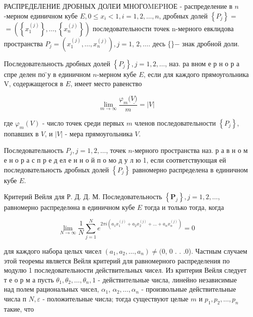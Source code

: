 \documentclass[10pt]{article}
\begin{document}
РАСПРЕДЕЛЕНИЕ ДРОБНЫХ ДОЛЕИ МНОГОMEPHОЕ - распределение в $n$-мерном единичном кубе $E, 0 \leqslant x_{i}<1, i=1,2, \ldots, n$, дробных долей $\left\{P_{j}\right\}=$ $=\left(\left\{x_{1}^{(j)}\right\}, \ldots,\left\{x_{n}^{(j)}\right\}\right)$ последовательности точек n-мерного евклидова пространства $P_{j}=\left(x_{1}^{(j)}, \ldots, x_{n}^{(j)}\right), j=1$, $2, \ldots$. десь \{\}$-$ знак дробной доли.



Последовательность дробных долей $\left\{P_{j}\right\}, j=1,2, \ldots$, наз. ра вном е р н о р а спре делен по ̈у в единичном $n$-мерном кубе $E$, если для каждого прямоугольника $\mathrm{V}$, содержащегося в $E$, имеет место равенство



\[

\lim _{m \rightarrow \infty} \frac{\varphi_{m}(\underline{V)}}{m}=|V|

\]



где $\varphi_{m}(V)$ - число точек среди первых $m$ членов последовательности $\left\{P_{j}\right\}$, попавших в $V$, и $|V|$ - мера прямоугольника $V$.



Последовательность $P_{j}, j=1,2, \ldots$, точек $n$-мерного пространства наз. р а в н о м е н о р а с п р е д ел е н н о й п о мо д у л ю 1, если соответствующая ей последовательность дробных долей $\left\{P_{j}\right\}$ равномерно распределена в единичном кубе $E$.



Критерий Вейля для Р. Д. Д. М. Последовательность $\left\{\boldsymbol{P}_{j}\right\}, j=1,2, \ldots$, равномерно распределөна в единичном кубе $E$ тогда и только тогда, когда



\[

\lim _{N \rightarrow \infty} \frac{1}{N} \sum_{j=1}^{N} e^{2 \pi i\left(a_{1} x_{1}^{(j)}+a_{2} x_{2}^{(j)}+\ldots+a_{n} x_{n}^{(j)}\right)}=0

\]



для каждого набора целых чисел $\left(a_{1}, a_{2}, \ldots, a_{n}\right) \neq(0$, 0 . . .0). Частным случаем этой теоремы является Вейля критерий для равномерного распределения по модулю 1 последовательности действительных чисел. Из критерия Вейля следует т е о р м а пусть $\theta_{1}, \theta_{2}, \ldots, \theta_{n}, 1$ - действительные числа, линейно независимые над полем рациональных чисел, $\alpha_{1}$, $\alpha_{2}, \ldots, \alpha_{n}$ - произвольные действительные числа п $N, \varepsilon$ - положительные числа; тогда существуют целые $m$ и $p_{1}, p_{2}, \ldots, p_{n}$ такие, что
\end{document}
